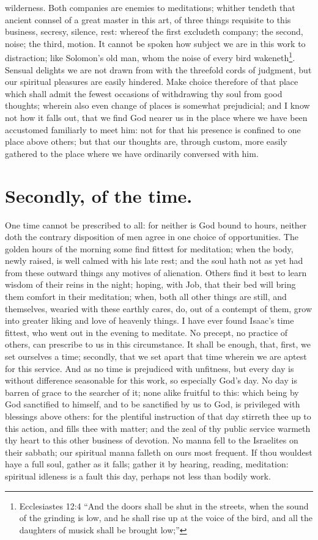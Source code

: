 wilderness. Both companies are enemies to meditations; whither tendeth that ancient connsel of a great master in this art, of three things requisite to this business, secresy, silence, rest: whereof the first excludeth company; the second, noise; the third, motion. It cannot be spoken how subject we are in this work to distraction; like Solomon's old man, whom the noise of every bird wakeneth\footnote{Ecclesiastes 12:4 ``And the doors shall be shut in the streets, when the sound of the grinding is low, and he shall rise up at the voice of the bird, and all the daughters of musick shall be brought low;''}. Sensual delights we are not drawn from with the threefold cords of judgment, but our spiritual pleasures are easily hindered. Make choice therefore of that place which shall admit the fewest occasions of withdrawing thy soul from good thoughts; wherein also even change of places is somewhat prejudicial; and I know not how it falls out, that we find God nearer us in the place where we have been accustomed familiarly to meet him: not for that his presence is confined to one place above others; but that our thoughts are, through custom, more easily gathered to the place where we have ordinarily conversed with him. 

\section{Secondly, of the time.}
One time cannot be prescribed to all: for neither is God bound to hours, neither doth the contrary disposition of men agree in one choice of opportunities. The golden hours of the morning some find fittest for meditation; when the body, newly raised, is well calmed with his late rest; and the soul hath not as yet had from these outward things any motives of alienation. Others find it best to learn wisdom of their reins in the night; hoping, with Job, that their bed will bring them comfort in their meditation; when, both all other things are still, and themselves, wearied with these earthly cares, do, out of a contempt of them, grow into greater liking and love of heavenly things. I have ever found Isaac's time fittest, who went out in the evening to meditate. No precept, no practice of others, can prescribe to us in this circumstance. It shall be enough, that, first, we set ourselves a time; secondly, that we set apart that time wherein we are aptest for this service. And as no time is prejudiced with unfitness, but every day is without difference seasonable for this work, so especially God's day. No day is barren of grace to the searcher of it; none alike fruitful to this: which being by God sanctified to himself, and to be sanctified by us to God, is privileged with blessings above others: for the plentiful instruction of that day stirreth thee up to this action, and fills thee with matter; and the zeal of thy public service warmeth thy heart to this other business of devotion. No manna fell to the Israelites on their sabbath; our spiritual manna falleth on ours most frequent. If thou wouldest haye a full soul, gather as it falls; gather it by hearing, reading, meditation: spiritual idleness is a fault this day, perhaps not less than bodily work. 

